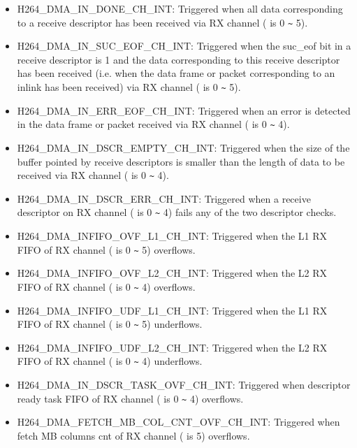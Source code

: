 \documentclass[main\_\_EN.tex]{subfiles}
\begin{document}
\begin{itemize}
\item \label{int:H264DMAINDONECHNINT}H264\_DMA\_IN\_DONE\_CH{}\_INT: Triggered when all data corresponding to a receive descriptor has been received via RX channel  ( is 0 \verb+~+ 5).
\item \label{int:H264DMAINSUCEOFCHNINT}H264\_DMA\_IN\_SUC\_EOF\_CH{}\_INT: Triggered when the suc\_eof bit in a receive descriptor is 1 and the data corresponding to this receive descriptor has been received (i.e. when the data frame or packet corresponding to an inlink has been received) via RX channel  ( is 0 \verb+~+ 5).
\item \label{int:H264DMAINERREOFCHNINT}H264\_DMA\_IN\_ERR\_EOF\_CH{}\_INT: Triggered when an error is detected in the data frame or packet received via RX channel  ( is 0 \verb+~+ 4).
\item \label{int:H264DMAINDSCREMPTYCHNINT}H264\_DMA\_IN\_DSCR\_EMPTY\_CH{}\_INT: Triggered when the size of the buffer pointed by receive descriptors is smaller than the length of data to be received via RX channel  ( is 0 \verb+~+ 4).
\item \label{int:H264DMAINDSCRERRCHNINT}H264\_DMA\_IN\_DSCR\_ERR\_CH{}\_INT: Triggered when a receive descriptor on RX channel  ( is 0 \verb+~+ 4) fails any of the two descriptor checks.
\item \label{int:H264DMAINFIFOOVFL1CHNINT}H264\_DMA\_INFIFO\_OVF\_L1\_CH{}\_INT: Triggered when the L1 RX FIFO of RX channel  ( is 0 \verb+~+ 5) overflows.
\item \label{int:H264DMAINFIFOOVFL2CHNINT}H264\_DMA\_INFIFO\_OVF\_L2\_CH{}\_INT: Triggered when the L2 RX FIFO of RX channel  ( is 0 \verb+~+ 4) overflows.
\item \label{int:H264DMAINFIFOUDFL1CHNINT}H264\_DMA\_INFIFO\_UDF\_L1\_CH{}\_INT: Triggered when the L1 RX FIFO of RX channel  ( is 0 \verb+~+ 5) underflows.
\item \label{int:H264DMAINFIFOUDFL2CHNINT}H264\_DMA\_INFIFO\_UDF\_L2\_CH{}\_INT: Triggered when the L2 RX FIFO of RX channel  ( is 0 \verb+~+ 4) underflows.
\item \label{int:H264DMAINDSCRTASKOVFCHNINT}H264\_DMA\_IN\_DSCR\_TASK\_OVF\_CH{}\_INT: Triggered when descriptor ready task FIFO of RX channel  ( is 0 \verb+~+ 4) overflows.
\item \label{int:H264DMAFETCHMBCOLCNTOVFCHNINT}H264\_DMA\_FETCH\_MB\_COL\_CNT\_OVF\_CH{}\_INT: Triggered when fetch MB columns cnt of RX channel  ( is 5) overflows.
\end{itemize}
\end{document}
